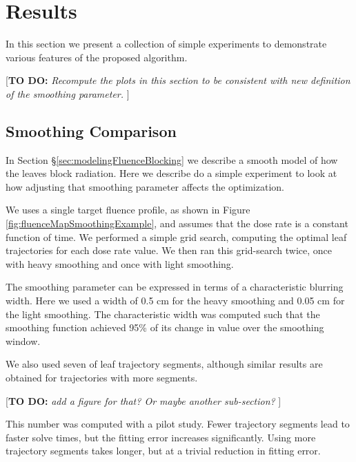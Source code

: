 \documentclass[12pt]{article}
\newcommand{\todo}[1]{{\color{lightblue}\par {[{\bf TO DO: } {\em #1}} ] \\    }}
\begin{document}
\section{Results}

In this section we present a collection of simple experiments to demonstrate various features of the
proposed algorithm.

\todo{Recompute the plots in this section to be consistent with new definition of the smoothing
      parameter.}

\subsection{Smoothing Comparison}
\label{sec:LeafSmoothingComparison}

In Section \S\ref{sec:modelingFluenceBlocking} we describe a smooth model of how the leaves block radiation.
Here we describe do a simple experiment to look at how adjusting that smoothing parameter affects the optimization.

We uses a single target fluence profile, as shown in Figure \ref{fig:fluenceMapSmoothingExample},
and assumes that the dose rate is a constant function of time.
We performed a simple grid search, computing the optimal leaf trajectories for each dose rate value.
We then ran this grid-search twice, once with heavy smoothing and once with light smoothing.

The smoothing parameter can be expressed in terms of a characteristic blurring width.
Here we used a width of 0.5 cm for the heavy smoothing and 0.05 cm for the light smoothing.
The characteristic width was computed such that the smoothing function achieved 95\% of its
change in value over the smoothing window.

We also used seven of leaf trajectory segments, although similar results are obtained for trajectories with more segments.
\todo{add a figure for that? Or maybe another sub-section?}
This number was computed with a pilot study.
Fewer trajectory segments lead to faster solve times, but the fitting error increases significantly.
Using more trajectory segments takes longer, but at a trivial reduction in fitting error.
\end{document}
